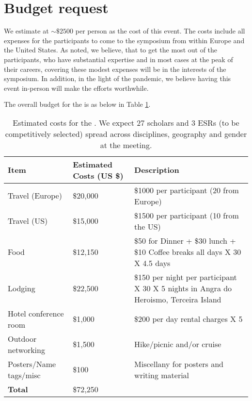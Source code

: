 \section{Budget request}

We estimate at $\sim \$2500$ per person as the cost of this event. The
costs include all expenses for the participants to come to the
symposium from within Europe and the United States. As noted, we
believe, that to get the most out of the participants, who have
substantial expertise and in most cases at the peak of their careers,
covering these modest expenses will be in the interests of the
symposium. In addition, in the light of the pandemic, we believe
having this event in-person will make the efforts worthwhile.

The overall budget for the \symp is as below in Table
\ref{tab:budget}. 

\begin{table}[!h]
  \footnotesize{
    \centering    
    \begin{tabular}{|p{3.5cm}|p{1.6cm}|p{10cm}|}
    \hline 
    \rowcolor{Gray}
    \bfseries Item& \bfseries Estimated Costs (US \$)&\bfseries Description\\
    \hline
      Travel (Europe)& \$20,000 & \$1000 per participant (20 from Europe) \\
    \hline
      Travel (US)& \$15,000 & \$1500 per participant (10 from the US) \\
    \hline
      Food& \$12,150 & \$50 for Dinner + \$30 lunch + \$10 Coffee
                       breaks all days X 30 X 4.5 days\\
    \hline
      Lodging& \$22,500 & \$150 per night per participant X 30 X 5 nights in Angra do Heroismo, Terceira Island\\
    \hline
      Hotel conference room &\$1,000 & \$200 per day rental charges X 5\\
    \hline
      Outdoor networking& \$1,500 & Hike/picnic and/or cruise\\
    \hline
      Posters/Name tags/misc& \$100 & Miscellany for posters and writing material\\
    \hline
    \textbf{Total}& \$72,250 &\\
    \hline        
  \end{tabular}
  \caption{Estimated costs for the \sympe. We expect 27 scholars and 3
    ESRs (to be competitively selected) spread across disciplines,
    geography and gender at the meeting.}
  \label{tab:budget}
}
\end{table}

